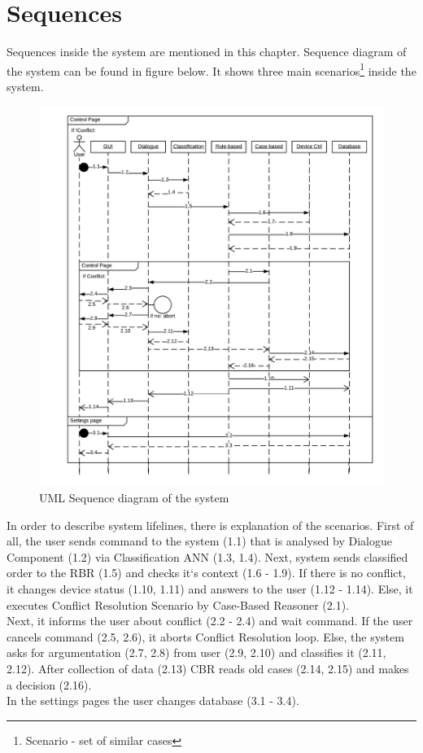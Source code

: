 \documentclass{llncs}
\begin{document}
    \section{Sequences}
    Sequences inside the system are mentioned in this chapter.
    Sequence diagram of the system can be found in figure below.
    It shows three main scenarios\footnote{Scenario - set of similar cases} inside the system.\\
    \begin{figure}
        \includegraphics[width=\textwidth]{UML.png}
        \caption[]{UML Sequence diagram of the system}
    \end{figure}
    In order to describe system lifelines, there is explanation of the scenarios.
    First of all, the user sends command to the system (1.1) that is analysed by Dialogue Component (1.2) via Classification ANN (1.3, 1.4).
    Next, system sends classified order to the RBR (1.5) and checks it`s context (1.6 - 1.9).
    If there is no conflict, it changes device status (1.10, 1.11) and answers to the user (1.12 - 1.14).
    Else, it executes Conflict Resolution Scenario by Case-Based Reasoner (2.1).\\
    Next, it informs the user about conflict (2.2 - 2.4) and wait command.
    If the user cancels command (2.5, 2.6), it aborts Conflict Resolution loop.
    Else, the system asks for argumentation (2.7, 2.8) from user (2.9, 2.10) and classifies it (2.11, 2.12).
    After collection of data (2.13) CBR reads old cases (2.14, 2.15) and makes a decision (2.16).\\
    In the settings pages the user changes database (3.1 - 3.4).
\end{document}
